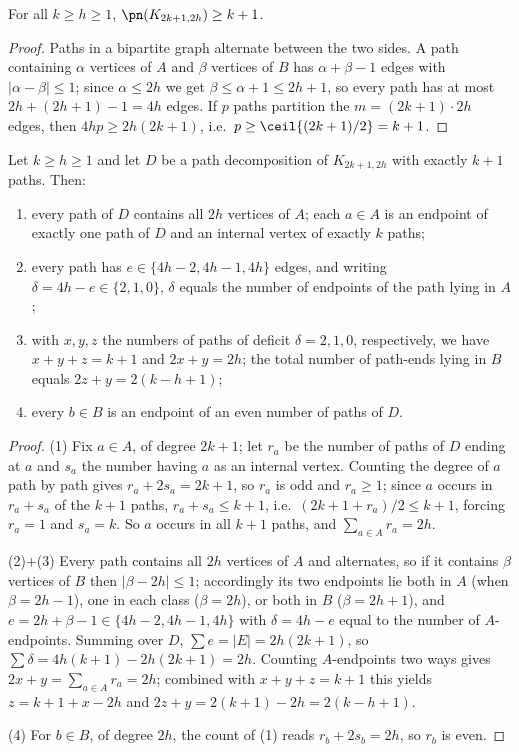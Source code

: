 \begin{theorem}\label{thm:capgen}
For all $k\ge h\ge1$, $\pn(K_{2k+1,2h})\ge k+1$.
\end{theorem}

\begin{proof}
Paths in a bipartite graph alternate between the two sides. A path containing $\alpha$ vertices
of $A$ and $\beta$ vertices of $B$ has $\alpha+\beta-1$ edges with $|\alpha-\beta|\le1$; since
$\alpha\le2h$ we get $\beta\le\alpha+1\le2h+1$, so every path has at most
$2h+(2h+1)-1=4h$ edges. If $p$ paths partition the $m=(2k+1)\cdot2h$ edges, then
$4hp\ge2h(2k+1)$, i.e.\ $p\ge\ceil{(2k+1)/2}=k+1$.
\end{proof}

\begin{theorem}\label{thm:structgen}
Let $k\ge h\ge1$ and let $D$ be a path decomposition of $K_{2k+1,2h}$ with exactly $k+1$ paths.
Then:
\begin{enumerate}[label={\rm(\arabic*)},leftmargin=2em]
\item every path of $D$ contains all $2h$ vertices of $A$; each $a\in A$ is an endpoint of
exactly one path of $D$ and an internal vertex of exactly $k$ paths;
\item every path has $e\in\{4h-2,4h-1,4h\}$ edges, and writing $\delta=4h-e\in\{2,1,0\}$,
$\delta$ equals the number of endpoints of the path lying in $A$;
\item with $x,y,z$ the numbers of paths of deficit $\delta=2,1,0$, respectively, we have
$x+y+z=k+1$ and $2x+y=2h$; the total number of path-ends lying in $B$ equals $2z+y=2(k-h+1)$;
\item every $b\in B$ is an endpoint of an even number of paths of $D$.
\end{enumerate}
\end{theorem}

\begin{proof}
(1) Fix $a\in A$, of degree $2k+1$; let $r_a$ be the number of paths of $D$ ending at $a$ and
$s_a$ the number having $a$ as an internal vertex. Counting the degree of $a$ path by path
gives $r_a+2s_a=2k+1$, so $r_a$ is odd and $r_a\ge1$; since $a$ occurs in $r_a+s_a$ of the
$k+1$ paths, $r_a+s_a\le k+1$, i.e.\ $(2k+1+r_a)/2\le k+1$, forcing $r_a=1$ and $s_a=k$. So $a$
occurs in all $k+1$ paths, and $\sum_{a\in A}r_a=2h$.

(2)+(3) Every path contains all $2h$ vertices of $A$ and alternates, so if it contains $\beta$
vertices of $B$ then $|\beta-2h|\le1$; accordingly its two endpoints lie both in $A$ (when
$\beta=2h-1$), one in each class ($\beta=2h$), or both in $B$ ($\beta=2h+1$), and
$e=2h+\beta-1\in\{4h-2,4h-1,4h\}$ with $\delta=4h-e$ equal to the number of $A$-endpoints.
Summing over $D$, $\sum e=|E|=2h(2k+1)$, so
$\sum\delta=4h(k+1)-2h(2k+1)=2h$. Counting $A$-endpoints two ways gives
$2x+y=\sum_{a\in A}r_a=2h$; combined with $x+y+z=k+1$ this yields $z=k+1+x-2h$ and
$2z+y=2(k+1)-2h=2(k-h+1)$.

(4) For $b\in B$, of degree $2h$, the count of (1) reads $r_b+2s_b=2h$, so $r_b$ is even.
\end{proof}

